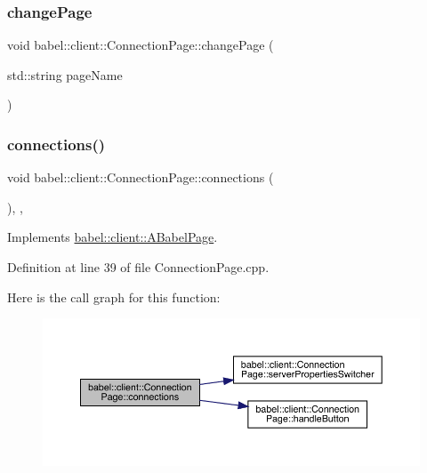 \subsubsection{\texorpdfstring{change\+Page}{changePage}}
{\footnotesize\ttfamily void babel\+::client\+::\+Connection\+Page\+::change\+Page (\begin{DoxyParamCaption}\item[{std\+::string}]{page\+Name }\end{DoxyParamCaption})\hspace{0.3cm}{\ttfamily [signal]}}

\mbox{\label{classbabel_1_1client_1_1_connection_page_a26c103c38cfa6d25e1b6a30a76746284}} 
\subsubsection{\texorpdfstring{connections()}{connections()}}
{\footnotesize\ttfamily void babel\+::client\+::\+Connection\+Page\+::connections (\begin{DoxyParamCaption}{ }\end{DoxyParamCaption})\hspace{0.3cm}{\ttfamily [override]}, {\ttfamily [protected]}, {\ttfamily [virtual]}}



Implements \mbox{\hyperlink{classbabel_1_1client_1_1_a_babel_page_a37097dfd8ded982074554509e5eab8b0}{babel\+::client\+::\+A\+Babel\+Page}}.



Definition at line 39 of file Connection\+Page.\+cpp.

Here is the call graph for this function\+:\nopagebreak
\begin{figure}[H]
\begin{center}
\leavevmode
\includegraphics[width=350pt]{classbabel_1_1client_1_1_connection_page_a26c103c38cfa6d25e1b6a30a76746284_cgraph}
\end{center}
\end{figure}
\mbox{\label{classbabel_1_1client_1_1_connection_page_a7426b5a671ce9de0827690a601ac0be8}} 
